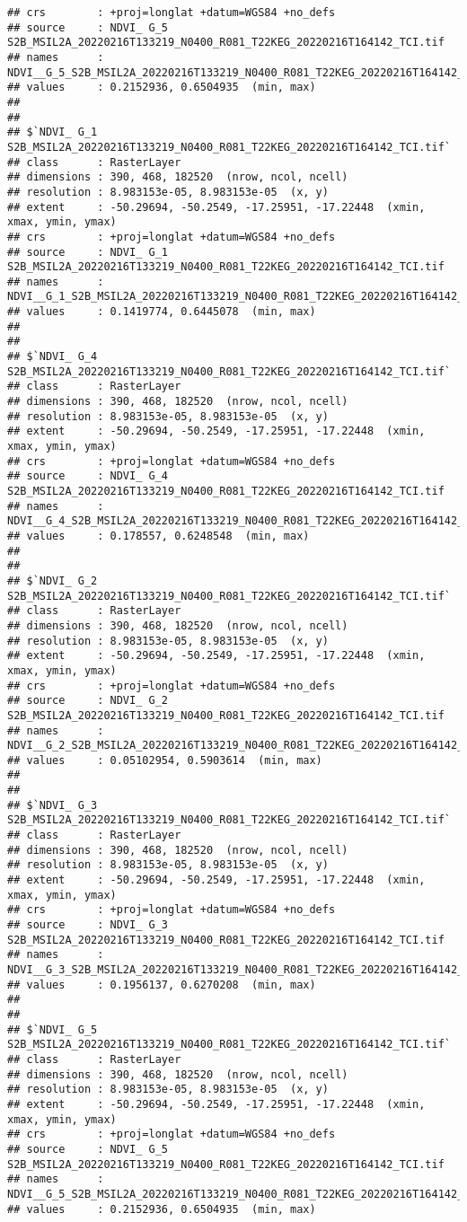 \documentclass[
]{article}
\begin{document}
\begin{verbatim}
## crs        : +proj=longlat +datum=WGS84 +no_defs 
## source     : NDVI_ G_5 S2B_MSIL2A_20220216T133219_N0400_R081_T22KEG_20220216T164142_TCI.tif 
## names      : NDVI__G_5_S2B_MSIL2A_20220216T133219_N0400_R081_T22KEG_20220216T164142_TCI 
## values     : 0.2152936, 0.6504935  (min, max)
## 
## 
## $`NDVI_ G_1 S2B_MSIL2A_20220216T133219_N0400_R081_T22KEG_20220216T164142_TCI.tif`
## class      : RasterLayer 
## dimensions : 390, 468, 182520  (nrow, ncol, ncell)
## resolution : 8.983153e-05, 8.983153e-05  (x, y)
## extent     : -50.29694, -50.2549, -17.25951, -17.22448  (xmin, xmax, ymin, ymax)
## crs        : +proj=longlat +datum=WGS84 +no_defs 
## source     : NDVI_ G_1 S2B_MSIL2A_20220216T133219_N0400_R081_T22KEG_20220216T164142_TCI.tif 
## names      : NDVI__G_1_S2B_MSIL2A_20220216T133219_N0400_R081_T22KEG_20220216T164142_TCI 
## values     : 0.1419774, 0.6445078  (min, max)
## 
## 
## $`NDVI_ G_4 S2B_MSIL2A_20220216T133219_N0400_R081_T22KEG_20220216T164142_TCI.tif`
## class      : RasterLayer 
## dimensions : 390, 468, 182520  (nrow, ncol, ncell)
## resolution : 8.983153e-05, 8.983153e-05  (x, y)
## extent     : -50.29694, -50.2549, -17.25951, -17.22448  (xmin, xmax, ymin, ymax)
## crs        : +proj=longlat +datum=WGS84 +no_defs 
## source     : NDVI_ G_4 S2B_MSIL2A_20220216T133219_N0400_R081_T22KEG_20220216T164142_TCI.tif 
## names      : NDVI__G_4_S2B_MSIL2A_20220216T133219_N0400_R081_T22KEG_20220216T164142_TCI 
## values     : 0.178557, 0.6248548  (min, max)
## 
## 
## $`NDVI_ G_2 S2B_MSIL2A_20220216T133219_N0400_R081_T22KEG_20220216T164142_TCI.tif`
## class      : RasterLayer 
## dimensions : 390, 468, 182520  (nrow, ncol, ncell)
## resolution : 8.983153e-05, 8.983153e-05  (x, y)
## extent     : -50.29694, -50.2549, -17.25951, -17.22448  (xmin, xmax, ymin, ymax)
## crs        : +proj=longlat +datum=WGS84 +no_defs 
## source     : NDVI_ G_2 S2B_MSIL2A_20220216T133219_N0400_R081_T22KEG_20220216T164142_TCI.tif 
## names      : NDVI__G_2_S2B_MSIL2A_20220216T133219_N0400_R081_T22KEG_20220216T164142_TCI 
## values     : 0.05102954, 0.5903614  (min, max)
## 
## 
## $`NDVI_ G_3 S2B_MSIL2A_20220216T133219_N0400_R081_T22KEG_20220216T164142_TCI.tif`
## class      : RasterLayer 
## dimensions : 390, 468, 182520  (nrow, ncol, ncell)
## resolution : 8.983153e-05, 8.983153e-05  (x, y)
## extent     : -50.29694, -50.2549, -17.25951, -17.22448  (xmin, xmax, ymin, ymax)
## crs        : +proj=longlat +datum=WGS84 +no_defs 
## source     : NDVI_ G_3 S2B_MSIL2A_20220216T133219_N0400_R081_T22KEG_20220216T164142_TCI.tif 
## names      : NDVI__G_3_S2B_MSIL2A_20220216T133219_N0400_R081_T22KEG_20220216T164142_TCI 
## values     : 0.1956137, 0.6270208  (min, max)
## 
## 
## $`NDVI_ G_5 S2B_MSIL2A_20220216T133219_N0400_R081_T22KEG_20220216T164142_TCI.tif`
## class      : RasterLayer 
## dimensions : 390, 468, 182520  (nrow, ncol, ncell)
## resolution : 8.983153e-05, 8.983153e-05  (x, y)
## extent     : -50.29694, -50.2549, -17.25951, -17.22448  (xmin, xmax, ymin, ymax)
## crs        : +proj=longlat +datum=WGS84 +no_defs 
## source     : NDVI_ G_5 S2B_MSIL2A_20220216T133219_N0400_R081_T22KEG_20220216T164142_TCI.tif 
## names      : NDVI__G_5_S2B_MSIL2A_20220216T133219_N0400_R081_T22KEG_20220216T164142_TCI 
## values     : 0.2152936, 0.6504935  (min, max)
\end{verbatim}
\end{document}
